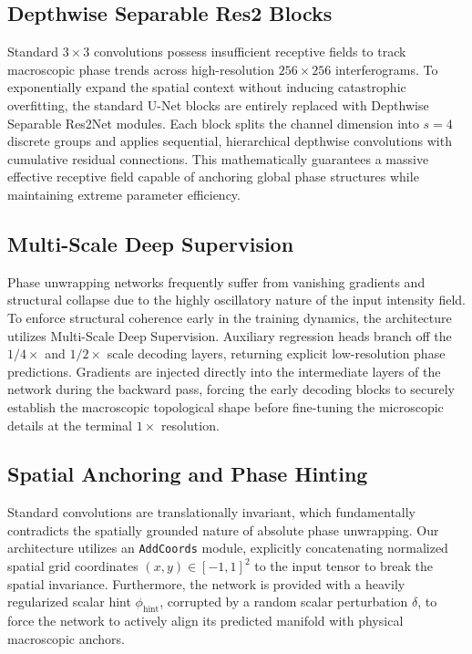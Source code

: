 \documentclass[11pt,onecolumn]{IEEEtran}
\begin{document}
\subsection{Depthwise Separable Res2 Blocks}
Standard $3 \times 3$ convolutions possess insufficient receptive fields to track macroscopic phase trends across high-resolution $256 \times 256$ interferograms. To exponentially expand the spatial context without inducing catastrophic overfitting, the standard U-Net blocks are entirely replaced with Depthwise Separable Res2Net modules. Each block splits the channel dimension into $s=4$ discrete groups and applies sequential, hierarchical depthwise convolutions with cumulative residual connections. This mathematically guarantees a massive effective receptive field capable of anchoring global phase structures while maintaining extreme parameter efficiency.

\subsection{Multi-Scale Deep Supervision}
Phase unwrapping networks frequently suffer from vanishing gradients and structural collapse due to the highly oscillatory nature of the input intensity field. To enforce structural coherence early in the training dynamics, the architecture utilizes Multi-Scale Deep Supervision. Auxiliary regression heads branch off the $1/4\times$ and $1/2\times$ scale decoding layers, returning explicit low-resolution phase predictions. Gradients are injected directly into the intermediate layers of the network during the backward pass, forcing the early decoding blocks to securely establish the macroscopic topological shape before fine-tuning the microscopic details at the terminal $1\times$ resolution.

\subsection{Spatial Anchoring and Phase Hinting}
Standard convolutions are translationally invariant, which fundamentally contradicts the spatially grounded nature of absolute phase unwrapping. Our architecture utilizes an \texttt{AddCoords} module, explicitly concatenating normalized spatial grid coordinates $(x,y) \in [-1, 1]^2$ to the input tensor to break the spatial invariance. Furthermore, the network is provided with a heavily regularized scalar hint $\phi_{\text{hint}}$, corrupted by a random scalar perturbation $\delta$, to force the network to actively align its predicted manifold with physical macroscopic anchors.
\end{document}
